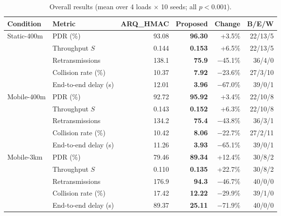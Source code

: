 \documentclass{article}
\begin{document}
\begin{table}[H]
\centering
\caption{Overall results (mean over 4 loads $\times$ 10 seeds; all $p < 0.001$).}
\label{tab:summary}
\small
{}
\begin{tabular}{@{}llrrrr@{}}
\toprule
\textbf{Condition} & \textbf{Metric} & \textbf{ARQ\_HMAC} & \textbf{Proposed} & \textbf{Change} & \textbf{B/E/W} \\
\midrule
\multirow{5}{*}{Static-400m} & PDR (\%) & 93.08 & \textbf{96.30} & +3.5\% & 22/13/5 \\
 & Throughput $S$ & 0.144 & \textbf{0.153} & +6.5\% & 22/13/5 \\
 & Retransmissions & 138.1 & \textbf{75.9} & $-$45.1\% & 36/4/0 \\
 & Collision rate (\%) & 10.37 & \textbf{7.92} & $-$23.6\% & 27/3/10 \\
 & End-to-end delay (s) & 12.01 & \textbf{3.96} & $-$67.0\% & 39/0/1 \\
\midrule
\multirow{5}{*}{Mobile-400m} & PDR (\%) & 92.72 & \textbf{95.92} & +3.4\% & 22/10/8 \\
 & Throughput $S$ & 0.143 & \textbf{0.152} & +6.3\% & 22/10/8 \\
 & Retransmissions & 134.2 & \textbf{75.4} & $-$43.8\% & 36/3/1 \\
 & Collision rate (\%) & 10.42 & \textbf{8.06} & $-$22.7\% & 27/2/11 \\
 & End-to-end delay (s) & 11.26 & \textbf{3.93} & $-$65.1\% & 39/0/1 \\
\midrule
\multirow{5}{*}{Mobile-3km} & PDR (\%) & 79.46 & \textbf{89.34} & +12.4\% & 30/8/2 \\
 & Throughput $S$ & 0.110 & \textbf{0.135} & +22.7\% & 30/8/2 \\
 & Retransmissions & 176.9 & \textbf{94.3} & $-$46.7\% & 40/0/0 \\
 & Collision rate (\%) & 17.42 & \textbf{12.22} & $-$29.9\% & 39/1/0 \\
 & End-to-end delay (s) & 89.37 & \textbf{25.11} & $-$71.9\% & 40/0/0 \\
\bottomrule
\end{tabular}
\end{table}
\end{document}
